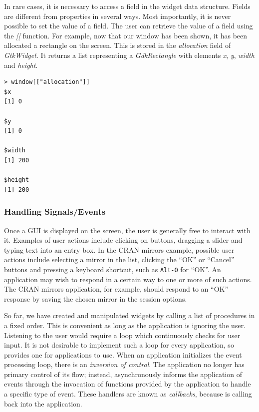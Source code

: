 \documentclass[article]{jss}
\begin{document}
In rare cases, it is necessary to access a field in the widget data structure.
Fields are different from properties in several ways. Most importantly, it is
never possible to set the value of a field. The user can retrieve the value of
a field using the \emph{[[} function. For example, now that our window
has been shown, it has been allocated a rectangle on the screen. This is stored
in the \emph{allocation} field of \emph{GtkWidget}. It returns a list 
representing a \emph{GdkRectangle} with
elements \emph{x}, \emph{y}, \emph{width} and \emph{height}.
\begin{verbatim}
> window[["allocation"]]
$x
[1] 0

$y
[1] 0

$width
[1] 200

$height
[1] 200
\end{verbatim}

\subsubsection{Handling Signals/Events}

Once a GUI is displayed on the screen, the user is 
generally free to interact with it. Examples of user actions include 
clicking on buttons, dragging a slider and typing text into an entry box.
In the CRAN mirrors example, possible user actions include
selecting a mirror in the list, clicking the ``OK'' or ``Cancel'' buttons 
and pressing a keyboard shortcut, such as \texttt{Alt-O} for ``OK''. 
An application may wish to respond in a certain way to one or more of such actions.
The CRAN mirrors application, for example, should respond to an ``OK'' response
by saving the chosen mirror in the session options.

So far, we have created and manipulated widgets by calling a list
of procedures in a fixed order. This is convenient as long as the application
is ignoring the user. Listening to the user would
require a loop which continuously checks for user input.
It is not desirable to implement such a loop for every application, so
 provides one for applications to use. When an application
initializes the  event processing loop, there is an 
\emph{inversion of control}. The application no longer has primary control
of its flow; instead,  asynchronously informs the application of 
events through the invocation of functions provided by the application to 
handle a specific type of event. These handlers are known as 
\emph{callbacks}, because  is calling back into the application. 
\end{document}
